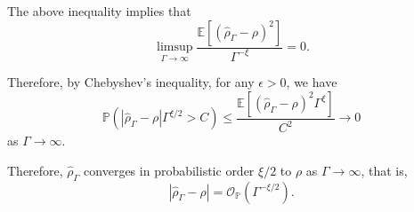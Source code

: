 The above inequality implies that
$$
\limsup_{\Gamma \to \infty} \frac{\mathbb{E} \left[ \left(\hat{\rho}_{\Gamma} - \rho\right)^2 \right]}{\Gamma^{-\xi}} =0.
$$

Therefore, by Chebyshev's inequality, for any $\epsilon > 0$, we have
$$
\mathbb{P} \left( \left| \hat{\rho}_{\Gamma} - \rho \right| \Gamma^{\xi/2} > C  \right) \leq \frac{\mathbb{E} \left[ \left(\hat{\rho}_{\Gamma} - \rho\right)^2 \Gamma^{\xi} \right]}{C^2 } \rightarrow 0 
$$
as $\Gamma \to \infty$.

Therefore, $\hat{\rho}_{\Gamma}$ converges in probabilistic order $\xi/2$ to $\rho$ as $\Gamma \to \infty$, that is,
$$
\left| \hat{\rho}_{\Gamma} - \rho \right| = \mathcal{O}_{\mathbb{P}} \left( \Gamma^{-\xi/2} \right).
$$
